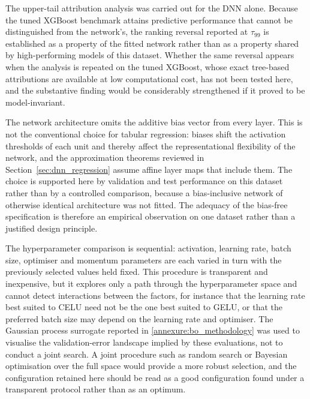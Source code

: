 The upper-tail attribution analysis was carried out for the DNN alone.
Because the tuned XGBoost benchmark attains predictive performance that
cannot be distinguished from the network's, the ranking reversal reported
at $\tau_{99}$ is established as a property of the fitted network rather
than as a property shared by high-performing models of this dataset.
Whether the same reversal appears when the analysis is repeated on the
tuned XGBoost, whose exact tree-based attributions are available at low
computational cost, has not been tested here, and the substantive finding
would be considerably strengthened if it proved to be model-invariant.

The network architecture omits the additive bias vector from every layer.
This is not the conventional choice for tabular regression: biases shift
the activation thresholds of each unit and thereby affect the
representational flexibility of the network, and the approximation
theorems reviewed in Section~\ref{sec:dnn_regression} assume affine layer
maps that include them.  The choice is supported here by validation and
test performance on this dataset rather than by a controlled comparison,
because a bias-inclusive network of otherwise identical architecture was
not fitted.  The adequacy of the bias-free specification is therefore an
empirical observation on one dataset rather than a justified design
principle.

The hyperparameter comparison is sequential: activation, learning rate,
batch size, optimiser and momentum parameters are each varied in turn with
the previously selected values held fixed.  This procedure is transparent
and inexpensive, but it explores only a path through the hyperparameter
space and cannot detect interactions between the factors, for instance
that the learning rate best suited to CELU need not be the one best suited
to GELU, or that the preferred batch size may depend on the learning rate
and optimiser.  The Gaussian process surrogate reported in
\ref{annexure:bo_methodology} was used to visualise the validation-error
landscape implied by these evaluations, not to conduct a joint search.  A
joint procedure such as random search or Bayesian optimisation over the
full space would provide a more robust selection, and the configuration
retained here should be read as a good configuration found under a
transparent protocol rather than as an optimum.

